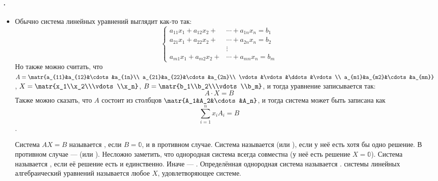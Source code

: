 \documentclass{article}
\begin{document}
    \paragraph{.}
    \begin{itemize}
        \item[]
        \begin{Comment}
            Обычно система линейных уравнений выглядит как-то так:
            \[\left\{\begin{aligned}
                a_{11}x_1+a_{12}x_2+&\cdots+a_{1n}x_n=b_1\\
                a_{21}x_1+a_{22}x_2+&\cdots+a_{2n}x_n=b_2\\
                &\vdots\\
                a_{m1}x_1+a_{m2}x_2+&\cdots+a_{mn}x_n=b_m
            \end{aligned}\right.\]
            Но также можно считать, что $A=\matr{a_{11}&a_{12}&\cdots&a_{1n}\\
                a_{21}&a_{22}&\cdots&a_{2n}\\
                \vdots&\vdots&\ddots&\vdots\\
                a_{m1}&a_{m2}&\cdots&a_{mn}}$, $X=\matr{x_1\\x_2\\\vdots\\x_n}$, $B=\matr{b_1\\b_2\\\vdots\\b_m}$, и тогда уравнение записывается так: \[A\cdot X=B\]
            Также можно сказать, что $A$ состоит из столбцов $\matr{A_1&A_2&\cdots&A_n}$, и тогда система может быть записана как
            \[\sum\limits_{i=1}^nx_iA_i=B\].
        \end{Comment}
        \dfn Система $AX=B$ называется , если $B=\mathbb0$, и  в противном случае.
        \dfn Система называется  (или ), если у неё есть хотя бы одно решение. В противном случае ---  (или ).
        \thm Несложно заметить, что однородная система всегда совместна (у неё есть решение $X=\mathbb0$).
        \dfn Система называется , если её решение есть и единственно. Иначе --- .
        \dfn Определённая однородная система называется .
        \dfn {} системы линейных алгебраический уравнений называется любое $X$, удовлетворяющее системе.

\end{itemize}
\end{document}
